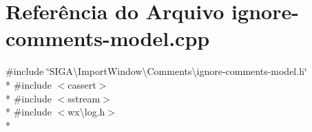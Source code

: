 \section{Referência do Arquivo ignore-\/comments-\/model.cpp}
\label{ignore-comments-model_8cpp}
{\ttfamily \#include \char`\"{}S\+I\+G\+A\textbackslash{}\+Import\+Window\textbackslash{}\+Comments\textbackslash{}ignore-\/comments-\/model.\+h\char`\"{}}\\*
{\ttfamily \#include $<$cassert$>$}\\*
{\ttfamily \#include $<$sstream$>$}\\*
{\ttfamily \#include $<$wx\textbackslash{}log.\+h$>$}\\*
